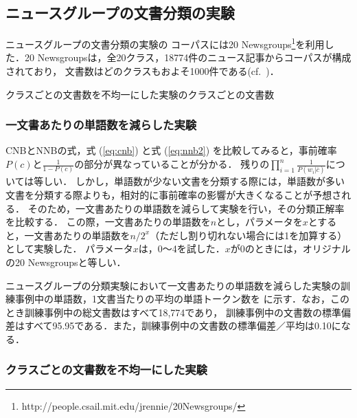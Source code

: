 \documentclass[japanese]{jnlp_1.4}
\newcommand{\tabref}[1]{}
\begin{document}
\subsection{ニュースグループの文書分類の実験}
\label{Sec:ニュースグループの文書分類の実験}

ニュースグループの文書分類の実験の
コーパスには20 Newsgroups\footnote{http://people.csail.mit.edu/jrennie/20Newsgroups/}を利用した．20 Newsgroupsは，全20クラス，18774件のニュース記事からコーパスが構成されており，
文書数はどのクラスもおよそ1000件である(cf.~\tabref{Tab:クラスごとの文書数を不均一にした実験のクラスごとの文書数})．

\begin{table}[b]
\caption{クラスごとの文書数を不均一にした実験のクラスごとの文書数}
\label{Tab:クラスごとの文書数を不均一にした実験のクラスごとの文書数}

\end{table}


\subsubsection{一文書あたりの単語数を減らした実験}

CNBとNNBの式，式 (\ref{eq:cnb}) と式 (\ref{eq:nnb2}) を比較してみると，事前確率$P(c)$と$ \frac{1}{1-P(c)}$の部分が異なっていることが分かる．
残りの$\prod_{i=1}^{n} \frac{1}{P(w_i|\bar{c})}$については等しい．
しかし，単語数が少ない文書を分類する際には，単語数が多い文書を分類する際よりも，相対的に事前確率の影響が大きくなることが予想される．
そのため，一文書あたりの単語数を減らして実験を行い，その分類正解率を比較する．
この際，一文書あたりの単語数を$n$とし，パラメータを$x$とすると，一文書あたりの単語数を$n/2^{x}$（ただし割り切れない場合には1を加算する）として実験した．
パラメータ$x$は，0〜4を試した．$x$が0のときには，オリジナルの20 Newsgroupsと等しい．

ニュースグループの分類実験において一文書あたりの単語数を減らした実験の訓練事例中の単語数，1文書当たりの平均の単語トークン数を
\tabref{Tab:一文書あたりの単語数を減らした実験のデータ}に示す．なお，このとき訓練事例中の総文書数はすべて18,774であり，
訓練事例中の文書数の標準偏差はすべて95.95である．また，訓練事例中の文書数の標準偏差／平均は0.10になる．



\subsubsection{クラスごとの文書数を不均一にした実験}
\end{document}
